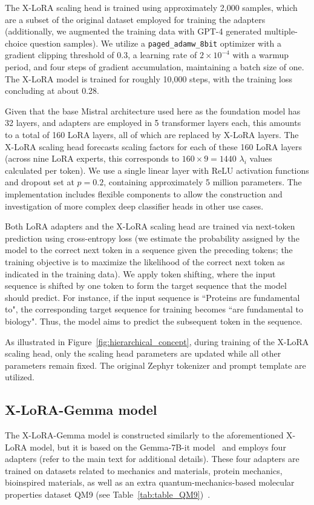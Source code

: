 The X-LoRA scaling head is trained using approximately 2,000 samples, which are a subset of the original dataset employed for training the adapters (additionally, we augmented the training data with GPT-4 generated multiple-choice question samples). We utilize a \texttt{paged\_adamw\_8bit} optimizer with a gradient clipping threshold of 0.3, a learning rate of $2\times 10^{-4}$ with a warmup period, and four steps of gradient accumulation, maintaining a batch size of one. The X-LoRA model is trained for roughly 10,000 steps, with the training loss concluding at about 0.28.

Given that the base Mistral architecture used here as the foundation model has 32 layers, and adapters are employed in 5 transformer layers each, this amounts to a total of 160 LoRA layers, all of which are replaced by X-LoRA layers. The X-LoRA scaling head forecasts scaling factors for each of these 160 LoRA layers (across nine LoRA experts, this corresponds to $160 \times 9 = 1440$ $\lambda_i$ values calculated per token). We use a single linear layer with ReLU activation functions and dropout set at $p=0.2$, containing approximately 5 million parameters. The implementation includes flexible components to allow the construction and investigation of more complex deep classifier heads in other use cases.

Both LoRA adapters and the X-LoRA scaling head are trained via next-token prediction using cross-entropy loss (we estimate the probability assigned by the model to the correct next token in a sequence given the preceding tokens; the training objective is to maximize the likelihood of the correct next token as indicated in the training data). We apply token shifting, where the input sequence is shifted by one token to form the target sequence that the model should predict. For instance, if the input sequence is ``Proteins are fundamental to", the corresponding target sequence for training becomes ``are fundamental to biology". Thus, the model aims to predict the subsequent token in the sequence.

As illustrated in Figure~\ref{fig:hierarchical_concept}, during training of the X-LoRA scaling head, only the scaling head parameters are updated while all other parameters remain fixed. The original Zephyr tokenizer and prompt template are utilized.

\subsection{X-LoRA-Gemma model} The X-LoRA-Gemma model is constructed similarly to the aforementioned X-LoRA model, but it is based on the Gemma-7B-it model~\cite{Google/gemma-7b-itFace} and employs four adapters (refer to the main text for additional details). These four adapters are trained on datasets related to mechanics and materials, protein mechanics, bioinspired materials, as well as an extra quantum-mechanics-based molecular properties dataset QM9 (see Table~\ref{tab:table_QM9})~\cite{Ruddigkeit2012EnumerationGDB-17,Ramakrishnan2015ElectronicSpace}.

